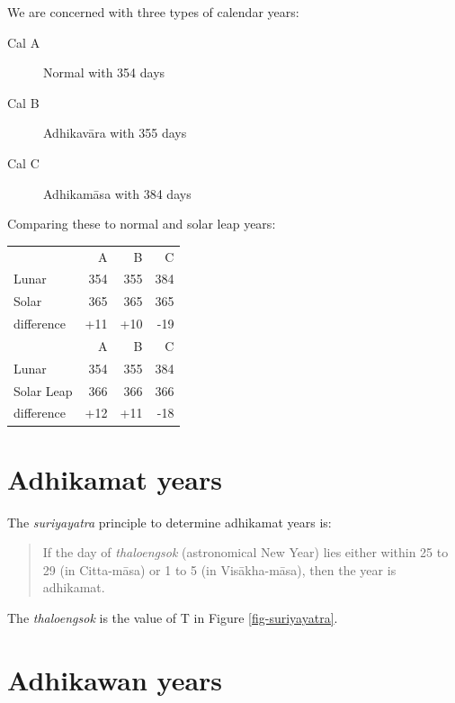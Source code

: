 \documentclass[11pt,oneside]{memoir-article}
\begin{document}
\begin{multicols}{2}

We are concerned with three types of calendar years:

\begin{description}
\item[{Cal A}] Normal with 354 days
\item[{Cal B}] Adhikavāra with 355 days
\item[{Cal C}] Adhikamāsa with 384 days
\end{description}

\columnbreak

Comparing these to normal and solar leap years:

\begin{center}
\begin{tabular}{lrrr}
 & A & B & C\\
Lunar & 354 & 355 & 384\\
Solar & 365 & 365 & 365\\
difference & +11 & +10 & -19\\
\hline
 & A & B & C\\
Lunar & 354 & 355 & 384\\
Solar Leap & 366 & 366 & 366\\
difference & +12 & +11 & -18\\
\end{tabular}
\end{center}

\end{multicols}

\section{Adhikamat years}
\label{sec-3-2}
\label{adhikamat-years}

The \emph{suriyayatra} principle to determine adhikamat years is:

\begin{quote}
If the day of \emph{thaloengsok} (astronomical New Year)
lies either within 25 to 29 (in Citta-māsa) or 1 to 5 (in
Visākha-māsa), then the year is adhikamat.\cite{prasert-ngan}
\end{quote}

The \emph{thaloengsok} is the value of T in Figure \ref{fig-suriyayatra}.

\section{Adhikawan years}
\label{sec-3-3}
\label{adhikawan-years}
\end{document}
